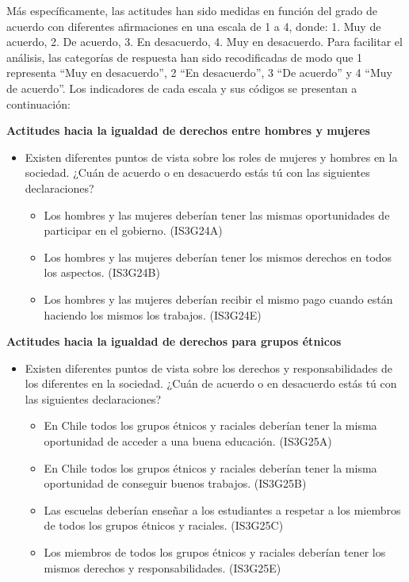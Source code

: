\documentclass[12pt,twoside]{templates/facsothesis}
\providecommand{\tightlist}{%
  \setlength{\itemsep}{0pt}\setlength{\parskip}{0pt}}
\begin{document}
Más específicamente, las actitudes han sido medidas en función del grado de acuerdo con diferentes afirmaciones en una escala de 1 a 4, donde: 1. Muy de acuerdo, 2. De acuerdo, 3. En desacuerdo, 4. Muy en desacuerdo. Para facilitar el análisis, las categorías de respuesta han sido recodificadas de modo que 1 representa ``Muy en desacuerdo'', 2 ``En desacuerdo'', 3 ``De acuerdo'' y 4 ``Muy de acuerdo''. Los indicadores de cada escala y sus códigos se presentan a continuación:

\textbf{Actitudes hacia la igualdad de derechos entre hombres y mujeres}

\begin{itemize}
\item
  Existen diferentes puntos de vista sobre los roles de mujeres y hombres en la sociedad. ¿Cuán de acuerdo o en desacuerdo estás tú con las siguientes declaraciones?

  \begin{itemize}
  \tightlist
  \item
    Los hombres y las mujeres deberían tener las mismas oportunidades de participar en el gobierno. (IS3G24A)
  \item
    Los hombres y las mujeres deberían tener los mismos derechos en todos los aspectos. (IS3G24B)
  \item
    Los hombres y las mujeres deberían recibir el mismo pago cuando están haciendo los mismos los trabajos. (IS3G24E)
  \end{itemize}
\end{itemize}

\textbf{Actitudes hacia la igualdad de derechos para grupos étnicos}

\begin{itemize}
\item
  Existen diferentes puntos de vista sobre los derechos y responsabilidades de los diferentes en la sociedad. ¿Cuán de acuerdo o en desacuerdo estás tú con las siguientes declaraciones?

  \begin{itemize}
  \tightlist
  \item
    En Chile todos los grupos étnicos y raciales deberían tener la misma oportunidad de acceder a una buena educación. (IS3G25A)
  \item
    En Chile todos los grupos étnicos y raciales deberían tener la misma oportunidad de conseguir buenos trabajos. (IS3G25B)
  \item
    Las escuelas deberían enseñar a los estudiantes a respetar a los miembros de todos los grupos étnicos y raciales. (IS3G25C)
  \item
    Los miembros de todos los grupos étnicos y raciales deberían tener los mismos derechos y responsabilidades. (IS3G25E)
  \end{itemize}
\end{itemize}
\end{document}
